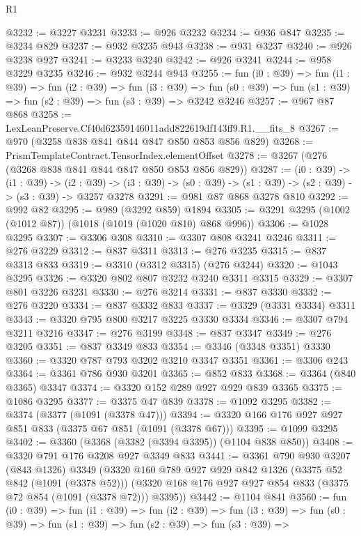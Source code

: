 \begin{lexlean}{R1}
\begin{coremodule}
@3232 := @3227 @3231
@3233 := @926 @3232
@3234 := @936 @847
@3235 := @3234 @829
@3237 := @932 @3235 @943
@3238 := @931 @3237
@3240 := @926 @3238 @927
@3241 := @3233 @3240
@3242 := @926 @3241
@3244 := @958 @3229 @3235
@3246 := @932 @3244 @943
@3255 := fun (i0 : @39) =>
  fun (i1 : @39) =>
  fun (i2 : @39) =>
  fun (i3 : @39) =>
  fun (s0 : @39) => fun (s1 : @39) => fun (s2 : @39) => fun (s3 : @39) => @3242 @3246
@3257 := @967 @87 @868
@3258 := LexLeanPreserve.Cf40d62359146011add822619df143ff9.R1.__fits_8
@3267 := @970 (@3258 @838 @841 @844 @847 @850 @853 @856 @829)
@3268 := PrismTemplateContract.TensorIndex.elementOffset
@3278 := @3267 (@276 (@3268 @838 @841 @844 @847 @850 @853 @856 @829))
@3287 := (i0 : @39) ->
  (i1 : @39) ->
  (i2 : @39) -> (i3 : @39) -> (s0 : @39) -> (s1 : @39) -> (s2 : @39) -> (s3 : @39) -> @3257 @3278
@3291 := @981 @87 @868 @3278 @810
@3292 := @992 @82
@3295 := @989 (@3292 @859) @1894
@3305 := @3291 @3295 (@1002 (@1012 @87)) (@1018 (@1019 (@1020 @810) @868 @996))
@3306 := @1028 @3295
@3307 := @3306 @308
@3310 := @3307 @808 @3241 @3246
@3311 := @276 @3229
@3312 := @837 @3311
@3313 := @276 @3235
@3315 := @837 @3313 @833
@3319 := @3310 (@3312 @3315) (@276 @3244)
@3320 := @1043 @3295
@3326 := @3320 @802 @807 @3232 @3240 @3311 @3315
@3329 := @3307 @801 @3226 @3231
@3330 := @276 @3214
@3331 := @837 @3330
@3332 := @276 @3220
@3334 := @837 @3332 @833
@3337 := @3329 (@3331 @3334) @3311
@3343 := @3320 @795 @800 @3217 @3225 @3330 @3334
@3346 := @3307 @794 @3211 @3216
@3347 := @276 @3199
@3348 := @837 @3347
@3349 := @276 @3205
@3351 := @837 @3349 @833
@3354 := @3346 (@3348 @3351) @3330
@3360 := @3320 @787 @793 @3202 @3210 @3347 @3351
@3361 := @3306 @243
@3364 := @3361 @786 @930 @3201
@3365 := @852 @833
@3368 := @3364 (@840 @3365) @3347
@3374 := @3320 @152 @289 @927 @929 @839 @3365
@3375 := @1086 @3295
@3377 := @3375 @47 @839
@3378 := @1092 @3295
@3382 := @3374 (@3377 (@1091 (@3378 @47)))
@3394 := @3320 @166 @176 @927 @927 @851 @833 (@3375 @67 @851 (@1091 (@3378 @67)))
@3395 := @1099 @3295
@3402 := @3360 (@3368 (@3382 (@3394 @3395)) (@1104 @838 @850))
@3408 := @3320 @791 @176 @3208 @927 @3349 @833
@3441 := @3361
    @790
    @930
    @3207
    (@843 @1326)
    @3349
    (@3320
      @160
      @789
      @927
      @929
      @842
      @1326
      (@3375 @52 @842 (@1091 (@3378 @52)))
      (@3320 @168 @176 @927 @927 @854 @833 (@3375 @72 @854 (@1091 (@3378 @72))) @3395))
@3442 := @1104 @841
@3560 := fun (i0 : @39) =>
  fun (i1 : @39) =>
  fun (i2 : @39) =>
  fun (i3 : @39) =>
  fun (s0 : @39) =>
  fun (s1 : @39) =>
  fun (s2 : @39) =>
  fun (s3 : @39) =>

\end{coremodule}
\end{lexlean}
